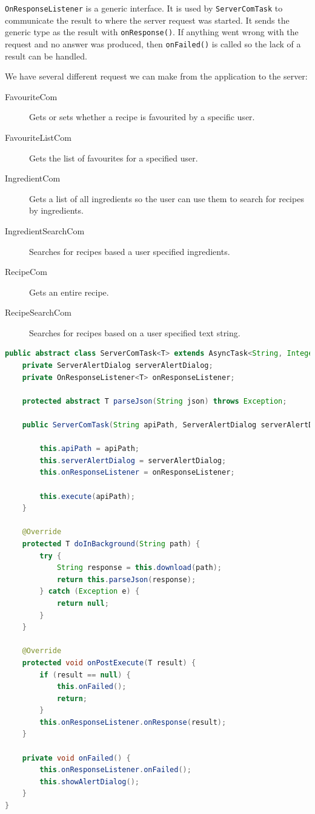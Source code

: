 \lstinline|OnResponseListener| is a generic interface. It is used by \lstinline|ServerComTask| to communicate the result to where the server request was started. It sends the generic type as the result with \lstinline|onResponse()|. If anything went wrong with the request and no answer was produced, then \lstinline|onFailed()| is called so the lack of a result can be handled.

We have several different request we can make from the application to the server:
\begin{description}
\item[FavouriteCom] Gets or sets whether a recipe is favourited by a specific user.
\item[FavouriteListCom] Gets the list of favourites for a specified user.
\item[IngredientCom] Gets a list of all ingredients so the user can use them to search for recipes by ingredients.
\item[IngredientSearchCom] Searches for recipes based a user specified ingredients.
\item[RecipeCom] Gets an entire recipe.
\item[RecipeSearchCom] Searches for recipes based on a user specified text string.
\end{description}

\begin{lstlisting}[language=java, label=lst:servercomtask, caption={Simplified code of the \lstinline|ServerComTask|}]
public abstract class ServerComTask<T> extends AsyncTask<String, Integer, T> {
    private ServerAlertDialog serverAlertDialog;
    private OnResponseListener<T> onResponseListener;

    protected abstract T parseJson(String json) throws Exception;
    
    public ServerComTask(String apiPath, ServerAlertDialog serverAlertDialog, OnResponseListener<T> onResponseListener) {
    
        this.apiPath = apiPath;
        this.serverAlertDialog = serverAlertDialog;
        this.onResponseListener = onResponseListener;

        this.execute(apiPath);
    }

    @Override
    protected T doInBackground(String path) {
        try {
            String response = this.download(path);
            return this.parseJson(response);
        } catch (Exception e) {
            return null;
        }
    }

    @Override
    protected void onPostExecute(T result) {
        if (result == null) {
            this.onFailed();
            return;
        }
        this.onResponseListener.onResponse(result);
    }
    
    private void onFailed() {
        this.onResponseListener.onFailed();
        this.showAlertDialog();
    }
}
\end{lstlisting}

